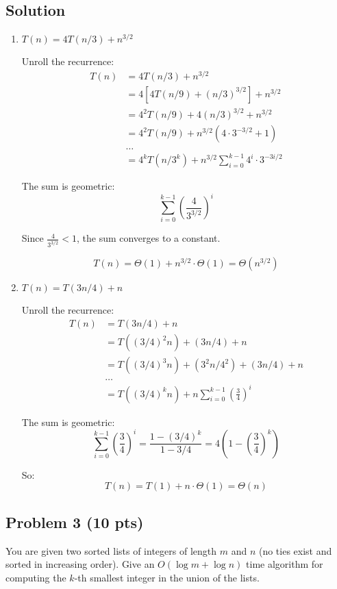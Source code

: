 \documentclass[12pt]{article}
\begin{document}
\subsection*{Solution}
\begin{enumerate}[label=(\alph*)]
    \item \(T(n) = 4T(n/3) + n^{3/2}\)

    Unroll the recurrence:
    \begin{align*}
    T(n) &= 4T(n/3) + n^{3/2} \\
         &= 4[4T(n/9) + (n/3)^{3/2}] + n^{3/2} \\
         &= 4^2T(n/9) + 4(n/3)^{3/2} + n^{3/2} \\
         &= 4^2T(n/9) + n^{3/2}(4 \cdot 3^{-3/2} + 1) \\
         &\dots \\
         &= 4^k T(n/3^k) + n^{3/2} \sum_{i=0}^{k-1} 4^i \cdot 3^{-3i/2}
    \end{align*}

    The sum is geometric:
    \[
    \sum_{i=0}^{k-1} \left(\frac{4}{3^{3/2}}\right)^i
    \]

    Since \(\frac{4}{3^{3/2}} < 1\), the sum converges to a constant.  

    \[
    T(n) = \Theta(1) + n^{3/2} \cdot \Theta(1) = \boxed{\Theta(n^{3/2})}
    \]

    \item \(T(n) = T(3n/4) + n\)

    Unroll the recurrence:
    \begin{align*}
    T(n) &= T(3n/4) + n \\
         &= T((3/4)^2 n) + (3n/4) + n \\
         &= T((3/4)^3 n) + (3^2 n / 4^2) + (3n/4) + n \\
         &\dots \\
         &= T((3/4)^k n) + n \sum_{i=0}^{k-1} \left(\frac{3}{4}\right)^i
    \end{align*}

    The sum is geometric:
    \[
    \sum_{i=0}^{k-1} \left(\frac{3}{4}\right)^i = \frac{1 - (3/4)^k}{1 - 3/4} = 4\left(1 - \left(\frac{3}{4}\right)^k\right)
    \]

    So:
    \[
    T(n) = T(1) + n \cdot \Theta(1) = \boxed{\Theta(n)}
    \]
\end{enumerate}

\subsection*{Problem 3 (10 pts)}
You are given two sorted lists of integers of length $m$ and $n$ (no ties exist and sorted in increasing order). Give an $O(\log m + \log n)$ time algorithm for computing the $k$-th smallest integer in the union of the lists.\\
\end{document}
